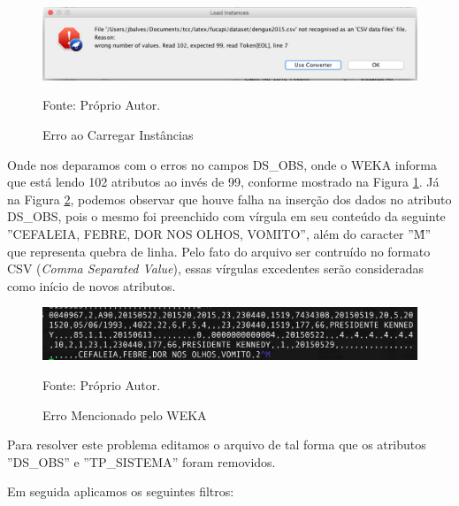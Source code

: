 \documentclass[
	12pt,				%
	openright,			%
	oneside,	
	a4paper,				%
	english,				%
	brazil				%
]{abntex2/abntex2} %
\begin{document}
		\begin{figure}[!htb]
			\caption{\label{figerroCarregarInstancias} Erro ao Carregar Instâncias}
			\begin{center}
				\includegraphics[scale=0.55]{img/erroCarregarInstancias.png}
			\end{center}
			Fonte: Próprio Autor.
		\end{figure}

	Onde nos deparamos com o erros no campos DS\_OBS, onde o WEKA informa que está lendo 102 atributos ao invés de 99, conforme mostrado na Figura \ref{figerroCarregarInstancias}. Já na Figura \ref{figerroLinhaSete}, podemos observar que houve falha na inserção dos dados no atributo DS\_OBS, pois o mesmo foi preenchido com vírgula em seu conteúdo da seguinte ''CEFALEIA, FEBRE, DOR NOS OLHOS, VOMITO'', além do caracter ''\^M'' que representa quebra de linha. Pelo fato do arquivo ser contruído no formato CSV (\textit{Comma Separated Value}), essas vírgulas excedentes serão consideradas como início de novos atributos.
	

	
		\begin{figure}[!htb]
			\caption{\label{figerroLinhaSete} Erro Mencionado pelo WEKA}
			\begin{center}
				\includegraphics[scale=0.45]{img/erroLinhaSete.png}
			\end{center}
			Fonte: Próprio Autor.
		\end{figure}
		
		Para resolver este problema editamos o arquivo de tal forma que os atributos ''DS\_OBS'' e ''TP\_SISTEMA'' foram removidos. 
		
		Em seguida aplicamos os seguintes filtros:
		
\end{document}
